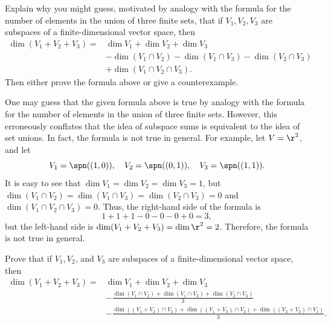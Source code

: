 \begin{exercise}[2c19]
    Explain why you might guess, motivated by analogy with the formula for the number of elements in the union of three finite sets, that if $V_1, V_2, V_3$ are subspaces of a finite-dimensional vector space, then
    \begin{align*}
        \dim(V_1 + V_2 + V_3) = & \dim V_1 + \dim V_2 + \dim V_3 \\
        & - \dim(V_1 \cap V_2) - \dim(V_1 \cap V_3) - \dim(V_2 \cap V_3) \\
        & + \dim(V_1 \cap V_2 \cap V_3).
    \end{align*}
    Then either prove the formula above or give a counterexample.
\end{exercise}

\begin{sol}
    One may guess that the given formula above is true by analogy with the formula for the number of elements in the union of three finite sets. However, this erroneously conflates that the idea of subspace sums is equivalent to the idea of set unions. In fact, the formula is not true in general. For example, let $V = \r^2$, and let
    \[V_1 = \spn((1, 0)), \quad V_2 = \spn((0, 1)), \quad V_3 = \spn((1, 1)).\]
    It is easy to see that $\dim V_1 = \dim V_2 = \dim V_3 = 1$, but $\dim(V_1 \cap V_2) = \dim(V_1 \cap V_3) = \dim(V_2 \cap V_3) = 0$ and $\dim(V_1 \cap V_2 \cap V_3) = 0$. Thus, the right-hand side of the formula is
    \[1 + 1 + 1 - 0 - 0 - 0 + 0 = 3,\]
    but the left-hand side is $\dim(V_1 + V_2 + V_3) = \dim \r^2 = 2$. Therefore, the formula is not true in general.
\end{sol}

\begin{exercise}[2c20]
    Prove that if $V_1, V_2$, and $V_3$ are subspaces of a finite-dimensional vector space, then
    \begin{align*}
        \dim(V_1 + V_2 + V_3) = & \dim V_1 + \dim V_2 + \dim V_3 \\
        &- \frac{\dim(V_1 \cap V_2) + \dim(V_1 \cap V_3) + \dim(V_2 \cap V_3)}{3} \\
        &- \frac{\dim((V_1 + V_2) \cap V_3) + \dim((V_1 + V_3) \cap V_2) + \dim((V_2 + V_3) \cap V_1)}{3}.
    \end{align*}
\end{exercise}

